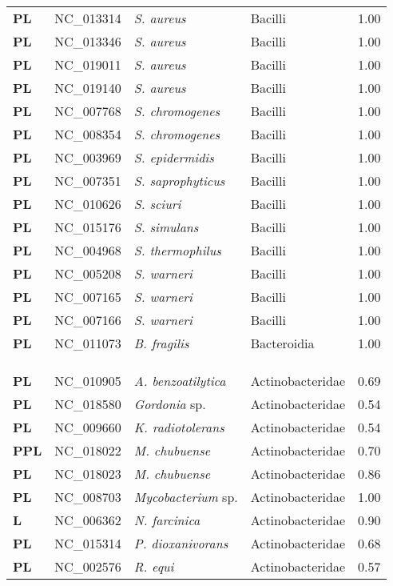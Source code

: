 \begin{adjustwidth}{-3cm}{2cm}
{\begin{supertabular}{>{\bfseries}l|p{0.1\textwidth}p{0.14\textwidth}l|l}
PL & NC\_013314 & \textit{S. aureus} & Bacilli & 1.00\\
PL & NC\_013346 & \textit{S. aureus} & Bacilli & 1.00\\
PL & NC\_019011 & \textit{S. aureus} & Bacilli & 1.00\\
PL & NC\_019140 & \textit{S. aureus} & Bacilli & 1.00\\
PL & NC\_007768 & \textit{S. chromogenes} & Bacilli & 1.00\\
PL & NC\_008354 & \textit{S. chromogenes} & Bacilli & 1.00\\
PL & NC\_003969 & \textit{S. epidermidis} & Bacilli & 1.00\\
PL & NC\_007351 & \textit{S. saprophyticus} & Bacilli & 1.00\\
PL & NC\_010626 & \textit{S. sciuri} & Bacilli & 1.00\\
PL & NC\_015176 & \textit{S. simulans} & Bacilli & 1.00\\
PL & NC\_004968 & \textit{S. thermophilus} & Bacilli & 1.00\\
PL & NC\_005208 & \textit{S. warneri} & Bacilli & 1.00\\
PL & NC\_007165 & \textit{S. warneri} & Bacilli & 1.00\\
PL & NC\_007166 & \textit{S. warneri} & Bacilli & 1.00\\
PL & NC\_011073 & \textit{B. fragilis} & Bacteroidia & 1.00\\
\\
\\
\hline\\
PL & NC\_010905 & \textit{A. benzoatilytica} & Actinobacteridae & 0.69\\
PL & NC\_018580 & \textit{Gordonia} sp. & Actinobacteridae & 0.54\\
PL & NC\_009660 & \textit{K. radiotolerans} & Actinobacteridae & 0.54\\
PPL & NC\_018022 & \textit{M. chubuense} & Actinobacteridae & 0.70\\
PL & NC\_018023 & \textit{M. chubuense} & Actinobacteridae & 0.86\\
PL & NC\_008703 & \textit{Mycobacterium} sp. & Actinobacteridae & 1.00\\
L & NC\_006362 & \textit{N. farcinica} & Actinobacteridae & 0.90\\
PL & NC\_015314 & \textit{P. dioxanivorans} & Actinobacteridae & 0.68\\
PL & NC\_002576 & \textit{R. equi} & Actinobacteridae & 0.57\\

\end{supertabular}}
\end{adjustwidth}
